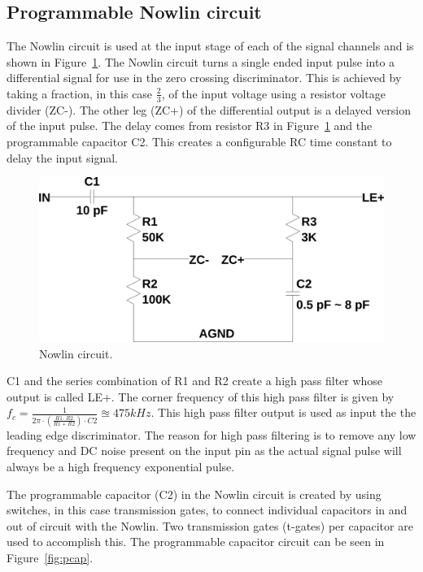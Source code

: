 \documentclass[12pt,oneside,final]{siuethesis}
\theoremstyle{definition}
\begin{document}
\subsection{Programmable Nowlin circuit}
\par The Nowlin circuit is used at the input stage of each of the signal channels and is shown in Figure~\ref{fig:Nowlin}. The Nowlin circuit turns a single ended input pulse into a differential signal for use in the zero crossing discriminator. This is achieved by taking a fraction, in this case $\frac{2}{3}$, of the input voltage using a resistor voltage divider (ZC-). The other leg (ZC+) of the differential output is a delayed version of the input pulse. The delay comes from resistor R3 in Figure~\ref{fig:Nowlin} and the programmable capacitor C2. This creates a configurable RC time constant to delay the input signal. 
\begin{figure}[ht]
\centering
\includegraphics[scale=.3,keepaspectratio=true]{../LTspice_Drawings/nowlin/nowlin.png} 
\caption{Nowlin circuit.}
\label{fig:Nowlin}
\end{figure}
\par C1 and the series combination of R1 and R2 create a high pass filter whose output is called LE+. The corner frequency of this high pass filter is given by $f_{c} = \frac{1}{2\pi \cdot(\frac{R1 \cdot R2}{R1 + R2})\cdot C2} \approxeq 475  kHz$. This high pass filter output is used as input the the leading edge discriminator. The reason for high pass filtering is to remove any low frequency and DC noise present on the input pin as the actual signal pulse will always be a high frequency exponential pulse.
\par The programmable capacitor (C2) in the Nowlin circuit is created by using switches, in this case transmission gates, to connect individual capacitors in and out of circuit with the Nowlin. Two transmission gates (t-gates) per capacitor are used to accomplish this. The programmable capacitor circuit can be seen in Figure~\ref{fig:pcap}.
\end{document}
